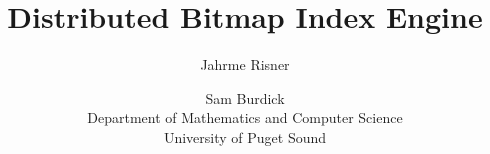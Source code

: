 \documentclass[letterpaper,draft]{article}
\title{Distributed Bitmap Index Engine}
\author{{Jahrme Risner}\and{Sam Burdick}\\Department of Mathematics and Computer Science\\University of Puget Sound}
\begin{document}
\maketitle


\nocite{*} %

\end{document}
